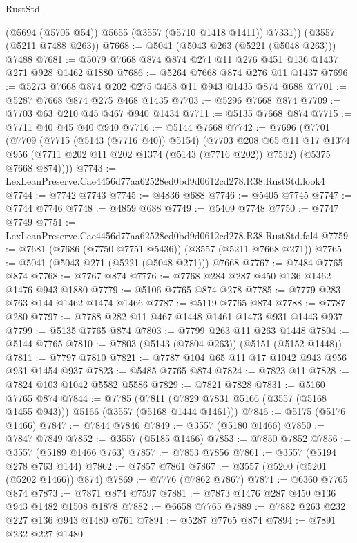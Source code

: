\begin{lexlean}{RustStd}
\begin{coremodule}
        (@5694 (@5705 @54))
        @5655
        (@3557 (@5710 @1418 @1411))
        @7331))
    (@3557 (@5211 @7488 @263))
@7668 := @5041 (@5043 @263 (@5221 (@5048 @263))) @7488
@7681 := @5079 @7668 @874 @874 @271 @11 @276 @451 @136 @1437 @271 @928 @1462 @1880
@7686 := @5264 @7668 @874 @276 @11 @1437
@7696 := @5273 @7668 @874 @202 @275 @468 @11 @943 @1435 @874 @688
@7701 := @5287 @7668 @874 @275 @468 @1435
@7703 := @5296 @7668 @874
@7709 := @7703 @63 @210 @45 @467 @940 @1434
@7711 := @5135 @7668 @874
@7715 := @7711 @40 @45 @40 @940
@7716 := @5144 @7668
@7742 := @7696
    (@7701
      (@7709
        (@7715 (@5143 (@7716 @40)) @5154)
        (@7703
          @208
          @65
          @11
          @17
          @1374
          @956
          (@7711 @202 @11 @202 @1374 (@5143 (@7716 @202)) @7532)
          (@5375 @7668 @874))))
@7743 := LexLeanPreserve.Cae4456d77aa62528ed0bd9d0612cd278.R38.RustStd.look4
@7744 := @7742 @7743
@7745 := @4836 @688
@7746 := @5405 @7745
@7747 := @7744 @7746
@7748 := @4859 @688
@7749 := @5409 @7748
@7750 := @7747 @7749
@7751 := LexLeanPreserve.Cae4456d77aa62528ed0bd9d0612cd278.R38.RustStd.fal4
@7759 := @7681 (@7686 (@7750 @7751 @5436)) (@3557 (@5211 @7668 @271))
@7765 := @5041 (@5043 @271 (@5221 (@5048 @271))) @7668
@7767 := @7484 @7765 @874
@7768 := @7767 @874
@7776 := @7768 @284 @287 @450 @136 @1462 @1476 @943 @1880
@7779 := @5106 @7765 @874 @278
@7785 := @7779 @283 @763 @144 @1462 @1474 @1466
@7787 := @5119 @7765 @874
@7788 := @7787 @280
@7797 := @7788 @282 @11 @467 @1448 @1461 @1473 @931 @1443 @937
@7799 := @5135 @7765 @874
@7803 := @7799 @263 @11 @263 @1448
@7804 := @5144 @7765
@7810 := @7803 (@5143 (@7804 @263)) (@5151 (@5152 @1448))
@7811 := @7797 @7810
@7821 := @7787 @104 @65 @11 @17 @1042 @943 @956 @931 @1454 @937
@7823 := @5485 @7765 @874
@7824 := @7823 @11
@7828 := @7824 @103 @1042 @5582 @5586
@7829 := @7821 @7828
@7831 := @5160 @7765 @874
@7844 := @7785
    (@7811 (@7829 @7831 @5166 (@3557 (@5168 @1455 @943))) @5166 (@3557 (@5168 @1444 @1461)))
@7846 := @5175 (@5176 @1466)
@7847 := @7844 @7846
@7849 := @3557 (@5180 @1466)
@7850 := @7847 @7849
@7852 := @3557 (@5185 @1466)
@7853 := @7850 @7852
@7856 := @3557 (@5189 @1466 @763)
@7857 := @7853 @7856
@7861 := @3557 (@5194 @278 @763 @144)
@7862 := @7857 @7861
@7867 := @3557 (@5200 (@5201 (@5202 @1466)) @874)
@7869 := @7776 (@7862 @7867)
@7871 := @6360 @7765 @874
@7873 := @7871 @874 @7597
@7881 := @7873 @1476 @287 @450 @136 @943 @1482 @1508 @1878
@7882 := @6658 @7765
@7889 := @7882 @263 @232 @227 @136 @943 @1480 @761
@7891 := @5287 @7765 @874
@7894 := @7891 @232 @227 @1480

\end{coremodule}
\end{lexlean}
